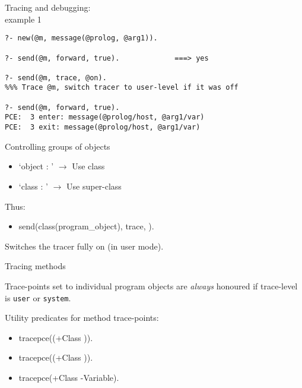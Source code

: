 \begin{sli}{Tracing and debugging:\\ example 1}

\begin{verbatim}
?- new(@m, message(@prolog, @arg1)).

?- send(@m, forward, true).             ===> yes

?- send(@m, trace, @on).
%%% Trace @m, switch tracer to user-level if it was off

?- send(@m, forward, true).
PCE:  3 enter: message(@prolog/host, @arg1/var)
PCE:  3 exit: message(@prolog/host, @arg1/var)
\end{verbatim}

\noindent
\end{sli}


\begin{sli}{Controlling groups of objects}

\begin{itemize}
    \item {}`object : ' $\longrightarrow$ Use class 
    \item {}`class : ' $\longrightarrow$ Use super-class 
\end{itemize}

Thus:

\begin{itemize}
    \item send(class(program_object), trace, ).
\end{itemize}

Switches the tracer fully on (in user mode).
\end{sli}


\begin{sli}{Tracing methods}

Trace-points set to individual program objects are {\em always} honoured
if trace-level is \verb$user$ or \verb$system$.

Utility predicates for method trace-points:

\begin{itemize}
    \item tracepce((+Class )).
    \item tracepce((+Class )).
    \item tracepce(+Class -Variable).
\end{itemize}
\end{sli}


